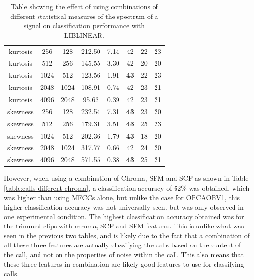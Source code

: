 \begin{table}
\begin{tabular}{|c|c|c|c|c|c|c|c|}
\hline
kurtosis & 256 & 128       &   212.50  &    7.14  &  42           & 22 & 23 \\
kurtosis & 512 & 256       &   145.55  &    3.30  &  42           & 20 & 20 \\
kurtosis & 1024 & 512      &   123.56  &    1.91  &  \textbf{43}  & 22 & 23 \\
kurtosis & 2048 & 1024     &   108.91  &    0.74  &  42           & 23 & 21 \\
kurtosis & 4096 & 2048     &    95.63  &    0.39  &  42           & 23 & 21 \\
\hline
skewness & 256 & 128       &   232.54  &    7.31  &  \textbf{43}  & 23 & 20  \\
skewness & 512 & 256       &   179.31  &    3.51  &  \textbf{43}  & 25 & 23 \\
skewness & 1024 & 512      &   202.36  &    1.79  &  \textbf{43}  & 18 & 20 \\
skewness & 2048 & 1024     &   317.77  &    0.66  &  42           & 24 & 20 \\
skewness & 4096 & 2048     &   571.55  &    0.38  &  \textbf{43}  & 25 & 21 \\
\hline
\end{tabular}
\caption{Table showing the effect of using
  combinations of different statistical measures of the spectrum of a
  signal on classification performance with LIBLINEAR.}
\label{table:calls-different-spectral}
\end{table}

However, when using a combination of Chroma, SFM and SCF as shown in
Table \ref{table:calls-different-chroma}, a classification accuracy of
62\% was obtained, which was higher than using MFCCs alone, but unlike
the case for ORCAOBV1, this higher classification accuracy was not
universally seen, but was only observed in one experimental condition.
The highest classification accuracy obtained was for the trimmed clips
with chroma, SCF and SFM features.  This is unlike what was seen in
the previous two tables, and is likely due to the fact that a
combination of all these three features are actually classifying the
calls based on the content of the call, and not on the properties of
noise within the call.  This also means that these three features in
combination are likely good features to use for classifying calls.

